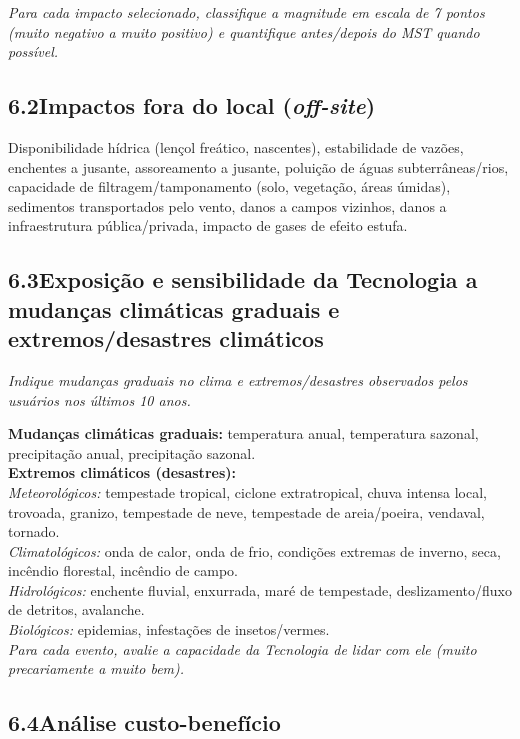 \medskip\noindent
\textit{Para cada impacto selecionado, classifique a magnitude em escala de 7 pontos (muito negativo a muito positivo) e quantifique antes/depois do MST quando possível.}

\subsection{6.2\quad Impactos fora do local (\textit{off-site})}

Disponibilidade hídrica (lençol freático, nascentes), estabilidade de vazões, enchentes a jusante, assoreamento a jusante, poluição de águas subterrâneas/rios, capacidade de filtragem/tamponamento (solo, vegetação, áreas úmidas), sedimentos transportados pelo vento, danos a campos vizinhos, danos a infraestrutura pública/privada, impacto de gases de efeito estufa.

\subsection{6.3\quad Exposição e sensibilidade da Tecnologia a mudanças climáticas graduais e extremos/desastres climáticos}

\textit{Indique mudanças graduais no clima e extremos/desastres observados pelos usuários nos últimos 10 anos.}

\medskip\noindent
\textbf{Mudanças climáticas graduais:} temperatura anual, temperatura sazonal, precipitação anual, precipitação sazonal.\\[4pt]
\textbf{Extremos climáticos (desastres):}\\
\textit{Meteorológicos:} tempestade tropical, ciclone extratropical, chuva intensa local, trovoada, granizo, tempestade de neve, tempestade de areia/poeira, vendaval, tornado.\\
\textit{Climatológicos:} onda de calor, onda de frio, condições extremas de inverno, seca, incêndio florestal, incêndio de campo.\\
\textit{Hidrológicos:} enchente fluvial, enxurrada, maré de tempestade, deslizamento/fluxo de detritos, avalanche.\\
\textit{Biológicos:} epidemias, infestações de insetos/vermes.\\[4pt]
\textit{Para cada evento, avalie a capacidade da Tecnologia de lidar com ele (muito precariamente a muito bem).}

\subsection{6.4\quad Análise custo-benefício}

